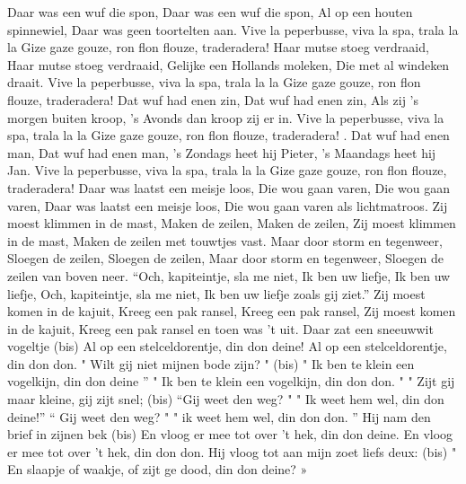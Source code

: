 \documentclass{article}
\begin{document}
\begin{songs}{}
\begin{intersong}
\end{intersong}
\beginverse
Daar was een wuf die spon,
Daar was een wuf die spon,
Al op een houten spinnewiel,
Daar was geen toortelten aan.
Vive la peperbusse, viva la spa, trala la la
Gize gaze gouze, ron flon flouze, traderadera!
\endverse
\beginverse
Haar mutse stoeg verdraaid,
Haar mutse stoeg verdraaid,
Gelijke een Hollands moleken,
Die met al windeken draait.
Vive la peperbusse, viva la spa, trala la la
Gize gaze gouze, ron flon flouze, traderadera!
\endverse
\beginverse
Dat wuf had enen zin,
Dat wuf had enen zin,
Als zij 's morgen buiten kroop,
's Avonds dan kroop zij er in. 
Vive la peperbusse, viva la spa, trala la la
Gize gaze gouze, ron flon flouze, traderadera!
\endverse
{}.	Dat wuf had enen man,
Dat wuf had enen man,
's Zondags heet hij Pieter,
's Maandags heet hij Jan. 
Vive la peperbusse, viva la spa, trala la la
Gize gaze gouze, ron flon flouze, traderadera!
\endverse
\endsong
{}
\beginverse
Daar was laatst een meisje loos, 
Die wou gaan varen,
Die wou gaan varen,
Daar was laatst een meisje loos,
Die wou gaan varen als lichtmatroos.
\endverse
\beginverse
Zij moest klimmen in de mast,
Maken de zeilen,
Maken de zeilen,
Zij moest klimmen in de mast,
Maken de zeilen met touwtjes vast.
\endverse
\beginverse
Maar door storm en tegenweer,
Sloegen de zeilen,
Sloegen de zeilen,
Maar door storm en tegenweer,
Sloegen de zeilen van boven neer. 
\endverse
\beginverse
“Och, kapiteintje, sla me niet,
Ik ben uw liefje,
Ik ben uw liefje,
Och, kapiteintje, sla me niet,
Ik ben uw liefje zoals gij ziet.”
\endverse
\beginverse
Zij moest komen in de kajuit,
Kreeg een pak ransel,
Kreeg een pak ransel,
Zij moest komen in de kajuit,
Kreeg een pak ransel en toen was 't uit. 
\endverse
\endsong
{}
\beginverse*
Daar zat een sneeuwwit vogeltje (bis)
Al op een stelceldorentje, din don deine!
Al op een stelceldorentje, din don don.
\endverse
\beginverse*
" Wilt gij niet mijnen bode zijn? " (bis)
" Ik ben te klein een vogelkijn, din don deine ” 
" Ik ben te klein een vogelkijn, din don don. "
\endverse
\beginverse*
" Zijt gij maar kleine, gij zijt snel; (bis)
“Gij weet den weg? " " Ik weet hem wel, din don deine!”
“ Gij weet den weg? " " ik weet hem wel, din don don. ”
\endverse
\beginverse*
Hij nam den brief in zijnen bek (bis)
En vloog er mee tot over 't hek, din don deine.
En vloog er mee tot over 't hek, din don don.
\endverse
\beginverse*
Hij vloog tot aan mijn zoet liefs deux: (bis)
" En slaapje of waakje, of zijt ge dood, din don deine? »

\end{songs}
\end{document}
